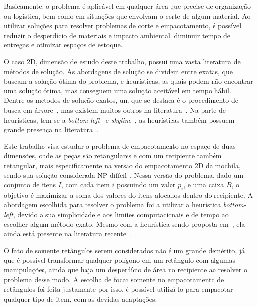 Basicamente, o problema é aplicável em qualquer área que precise de organização ou logística,
bem como em situações que envolvam o corte de algum material.
Ao utilizar soluções para resolver problemas de corte e empacotamento, é possível reduzir o
desperdício de materiais e impacto ambiental, diminuir tempo de entregas e otimizar espaços
de estoque.

O caso 2D, dimensão de estudo deste trabalho, possui uma vasta literatura de métodos de solução.
As abordagens de solução se dividem entre exatas, que buscam a solução ótima do problema, e
heurísticas, as quais podem não encontrar uma solução ótima, mas conseguem uma solução aceitável em
tempo hábil.
Dentre os métodos de solução exatos, um que se destaca é o procedimento de busca em árvore~\cite{
    beasley1985exact}, mas existem muitos outros na literatura~\cite{exact-solution-techniques,
    fekete1997new,delorme2016bin,kenmochi2009exact}.
Na parte de heurísticas, tem-se a \textit{bottom-left}~\cite{baker1980orthogonal,chehrazad2022fast}
e \textit{skyline}~\cite{wei2011skyline}, as heurísticas também possuem grande presença na
literatura~\cite{burke2004new,rakotonirainy2020improved,hopper2001empirical,chen2019efficient,
    huang2007efficient,hopper2001review}.

Este trabalho visa estudar o problema de empacotamento no espaço de duas dimensões, onde as peças
são retangulares e com um recipiente também retangular, mais especificamente na versão do
empacotamento 2D da mochila, sendo sua solução considerada NP-difícil~\cite{2DPackLib}.
Nessa versão do problema, dado um conjunto de itens $I$, com cada item $i$ possuindo um valor $p_i$,
e uma caixa $B$, o objetivo é maximizar a soma dos valores do itens alocados dentro do recipiente.
A abordagem escolhida para resolver o problema foi a utilizar a heurística \textit{bottom-left},
devido a sua simplicidade e aos limites computacionais e de tempo ao escolher algum método exato.
Mesmo com a heurística sendo proposta em~\citeyear*{baker1980orthogonal}, ela ainda está presente
na literatura recente~\cite{chehrazad2022fast,hopper2001empirical,wei2011skyline}.

O fato de somente retângulos serem considerados não é um grande demérito, já que é possível
transformar qualquer polígono em um retângulo com algumas manipulações, ainda que haja um
desperdício de área no recipiente ao resolver o problema desse modo.
A escolha de focar somente no empacotamento de retângulos foi feita justamente por isso, é possível
utilizá-lo para empacotar qualquer tipo de item, com as devidas adaptações.


